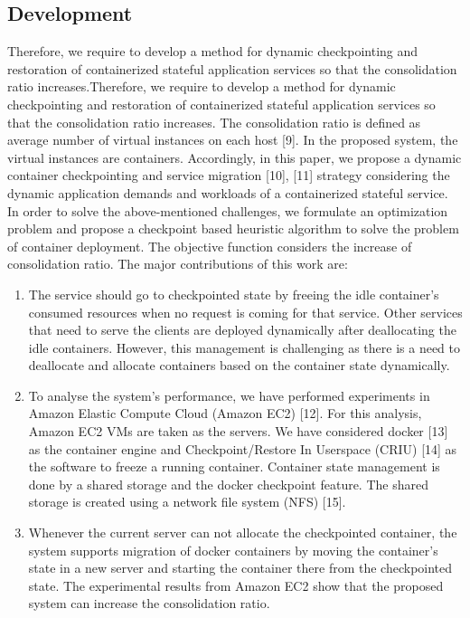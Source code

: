 \subsection{Development}
Therefore, we require to develop a method for dynamic
checkpointing and restoration of containerized stateful application services so that the consolidation ratio increases.Therefore, we require to develop a method for dynamic
checkpointing and restoration of containerized stateful application services so that the consolidation ratio increases.
The consolidation ratio is defined as average number of
virtual instances on each host [9]. In the proposed system,
the virtual instances are containers. Accordingly, in this paper,
we propose a dynamic container checkpointing and service
migration [10], [11] strategy considering the dynamic application demands and workloads of a containerized stateful
service. In order to solve the above-mentioned challenges, we
formulate an optimization problem and propose a checkpoint
based heuristic algorithm to solve the problem of container
deployment. The objective function considers the increase of consolidation ratio. The major contributions of this work are:
\begin{enumerate}[i]
\item The service should go to checkpointed state by freeing
the idle container’s consumed resources when no request
is coming for that service. Other services that need to
serve the clients are deployed dynamically after deallocating the idle containers. However, this management is
challenging as there is a need to deallocate and allocate
containers based on the container state dynamically.
\item  To analyse the system’s performance, we have performed
experiments in Amazon Elastic Compute Cloud (Amazon
EC2) [12]. For this analysis, Amazon EC2 VMs are taken
as the servers. We have considered docker [13] as the
container engine and Checkpoint/Restore In Userspace
(CRIU) [14] as the software to freeze a running container.
Container state management is done by a shared storage
and the docker checkpoint feature. The shared storage is
created using a network file system (NFS) [15].
\item Whenever the current server can not allocate the checkpointed container, the system supports migration of
docker containers by moving the container’s state in a
new server and starting the container there from the
checkpointed state. The experimental results from Amazon EC2 show that the proposed system can increase the
consolidation ratio.
\end{enumerate}

